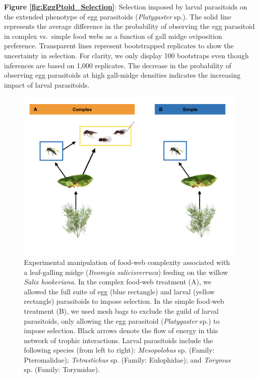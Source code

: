 \documentclass[11pt,]{article}
\begin{document}
\textbf{Figure \ref{fig:EggPtoid_Selection}}: Selection imposed by
larval parasitoids on the extended phenotype of egg parasitoids
(\emph{Platygaster} sp.). The solid line represents the average
difference in the probability of observing the egg parasitoid in complex
vs.~simple food webs as a function of gall midge oviposition preference.
Transparent lines represent bootstrapped replicates to show the
uncertainty in selection. For clarity, we only display 100 bootstraps
even though inferences are based on 1,000 replicates. The decrease in
the probability of observing egg parasitoids at high gall-midge
densities indicates the increasing impact of larval parasitoids.

\begin{figure}
\centering
\includegraphics{analyses/complex_simple_foodwebs.jpeg}
\caption{\label{fig:Conceptual}Experimental manipulation of food-web
complexity associated with a leaf-galling midge (\emph{Iteomyia
salicisverruca}) feeding on the willow \emph{Salix hookeriana}. In the
complex food-web treatment (A), we allowed the full suite of egg (blue
rectangle) and larval (yellow rectangle) parasitoids to impose
selection. In the simple food-web treatment (B), we used mesh bags to
exclude the guild of larval parasitoids, only allowing the egg
parasitoid (\emph{Platygaster} sp.) to impose selection. Black arrows
denote the flow of energy in this network of trophic interactions.
Larval parasitoids include the following species (from left to right):
\emph{Mesopolobus} sp. (Family: Pteromalidae); \emph{Tetrastichus} sp.
(Family: Eulophidae); and \emph{Torymus} sp. (Family: Torymidae).}
\end{figure}
\end{document}
